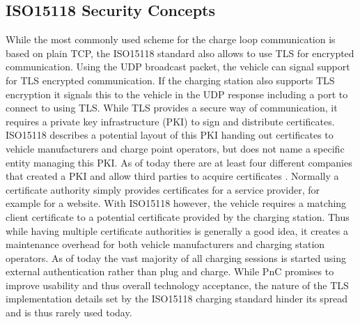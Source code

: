 \documentclass[conference,flushend]{iaria} %
\begin{document}
\subsection{ISO15118 Security Concepts}
While the most commonly used scheme for the charge loop communication is based on plain TCP, the ISO15118 standard also allows to use TLS for encrypted communication.
Using the UDP broadcast packet, the vehicle can signal support for TLS encrypted communication.
If the charging station also supports TLS encryption it signals this to the vehicle in the UDP response including a port to connect to using TLS.
While TLS provides a secure way of communication, it requires a private key infrastructure (PKI) to sign and distribute certificates.
ISO15118 describes a potential layout of this PKI handing out certificates to vehicle manufacturers and charge point operators, but does not name a specific entity managing this PKI.
As of today there are at least four different companies that created a PKI and allow third parties to acquire certificates \cite{charin_charin_nodate, hubject_download_nodate, nexusgroup_identities_nodate, irdeto_irdeto_nodate}.
Normally a certificate authority simply provides certificates for a service provider, for example for a website.
With ISO15118 however, the vehicle requires a matching client certificate to a potential certificate provided by the charging station.
Thus while having multiple certificate authorities is generally a good idea, it creates a maintenance overhead for both vehicle manufacturers and charging station operators.
As of today the vast majority of all charging sessions is started using external authentication rather than plug and charge.
While PnC promises to improve usability and thus overall technology acceptance, the nature of the TLS implementation details set by the ISO15118 charging standard hinder its spread and is thus rarely used today.
\end{document}
